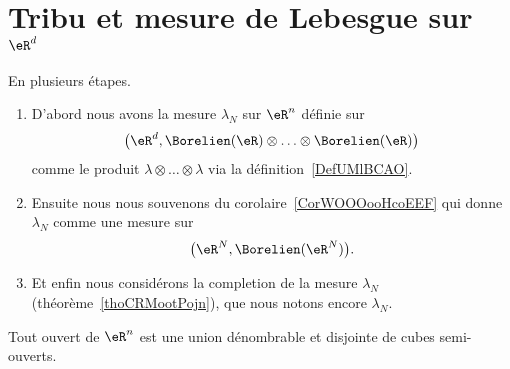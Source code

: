 \section{Tribu et mesure de Lebesgue sur \texorpdfstring{$ \eR^d$}{Rd}}

\begin{definition}      \label{DEFooSWJNooCSFeTF}
    En plusieurs étapes.
    \begin{enumerate}
        \item
            D'abord nous avons la mesure \( \lambda_N\) sur \( \eR^n\) définie sur
            \begin{equation}
                \big( \eR^d,\Borelien(\eR)\otimes\ldots\otimes\Borelien(\eR) \big)
            \end{equation}
            comme le produit \( \lambda\otimes\ldots\otimes \lambda\) via la définition~\ref{DefUMlBCAO}.
        \item
            Ensuite nous nous souvenons du corolaire~\ref{CorWOOOooHcoEEF} qui donne \( \lambda_N\) comme une mesure sur
            \begin{equation}
                \big( \eR^N,\Borelien(\eR^N) \big).
            \end{equation}
        \item
            Et enfin nous considérons la completion de la mesure \( \lambda_N\) (théorème~\ref{thoCRMootPojn}), que nous notons encore \( \lambda_N\).
    \end{enumerate}
\end{definition}

\begin{proposition}     \label{PropSKXGooRFHQst}
    Tout ouvert de \( \eR^n\) est une union dénombrable et disjointe de cubes semi-ouverts.
\end{proposition}

